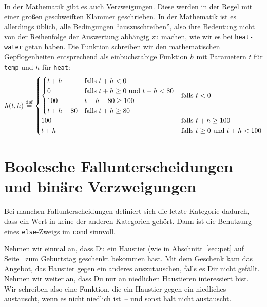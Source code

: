In der Mathematik gibt es auch Verzweigungen.  Diese werden in der
Regel mit einer großen geschweiften Klammer geschrieben.  In der
Mathematik ist es allerdings üblich, alle Bedingungen
"`auszuschreiben"', also ihre Bedeutung nicht von der Reihenfolge der
Auswertung abhängig zu machen, wie wir es bei \texttt{heat-water}
getan haben.  Die Funktion schreiben wir den mathematischen
Gepflogenheiten entsprechend als einbuchstabige Funktion $h$ mit
Parametern $t$ für \texttt{temp} und $h$ für \texttt{heat}:
%
\begin{displaymath}
  h(t, h) \stackrel{\rm def}{=}
  \begin{cases}
    \begin{cases}
      t + h & \text{falls } t + h < 0\\
      0 & \text{falls } t + h \geq 0 \text{ und } t + h < 80 \\
      100 & t + h - 80 \geq 100\\
      t + h - 80 & \text{falls }  t +h \geq
      80
    \end{cases}
    & \text{falls } t < 0
    \\
    100 & \text{falls } t + h \geq 100
    \\
    t + h & \text{falls } t \geq 0 \text{ und } t + h < 100
  \end{cases}
\end{displaymath}

\section{Boolesche Fallunterscheidungen und binäre Verzweigungen}
\label{sec:binaere-verzweigungen}

Bei manchen Fallunterscheidungen definiert sich die letzte Kategorie
dadurch, dass ein Wert in keine der anderen Kategorien gehört.  Dann
ist die Benutzung eines \texttt{else}-Zweigs im \texttt{cond}
sinnvoll.

Nehmen wir einmal an, dass Du ein Haustier (wie in
Abschnitt~\ref{sec:pet} auf Seite~\pageref{sec:pet} zum Geburtstag
geschenkt bekommen hast. Mit dem Geschenk kam das Angebot, das
Haustier gegen ein anderes auszutauschen, falls es Dir nicht gefällt.
Nehmen wir weiter an, dass Du nur an niedlichen Haustieren
interessiert bist.  Wir schreiben also eine Funktion, die ein Haustier
gegen ein niedliches austauscht, wenn es nicht niedlich ist~-- und
sonst halt nicht austauscht.

